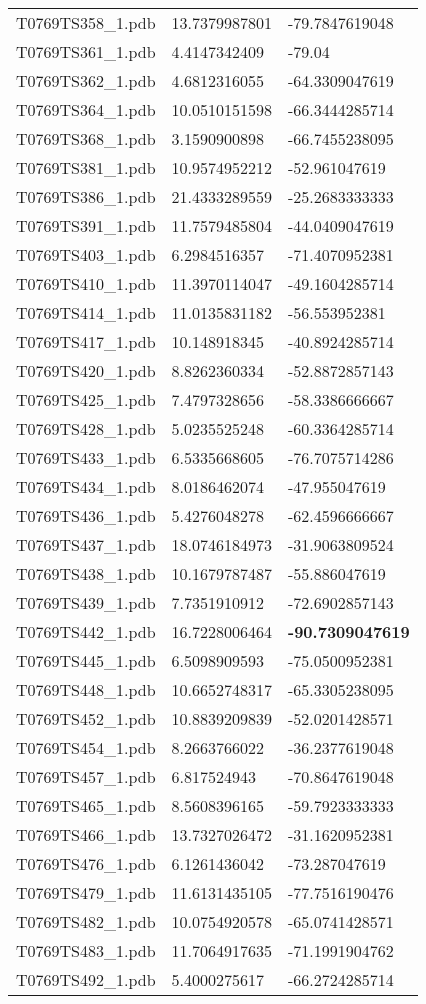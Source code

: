 \begin{longtable}{lll}
T0769TS358\_1.pdb & 13.7379987801 & -79.7847619048\\
T0769TS361\_1.pdb & 4.4147342409 & -79.04\\
T0769TS362\_1.pdb & 4.6812316055 & -64.3309047619\\
T0769TS364\_1.pdb & 10.0510151598 & -66.3444285714\\
T0769TS368\_1.pdb & 3.1590900898 & -66.7455238095\\
T0769TS381\_1.pdb & 10.9574952212 & -52.961047619\\
T0769TS386\_1.pdb & 21.4333289559 & -25.2683333333\\
T0769TS391\_1.pdb & 11.7579485804 & -44.0409047619\\
T0769TS403\_1.pdb & 6.2984516357 & -71.4070952381\\
T0769TS410\_1.pdb & 11.3970114047 & -49.1604285714\\
T0769TS414\_1.pdb & 11.0135831182 & -56.553952381\\
T0769TS417\_1.pdb & 10.148918345 & -40.8924285714\\
T0769TS420\_1.pdb & 8.8262360334 & -52.8872857143\\
T0769TS425\_1.pdb & 7.4797328656 & -58.3386666667\\
T0769TS428\_1.pdb & 5.0235525248 & -60.3364285714\\
T0769TS433\_1.pdb & 6.5335668605 & -76.7075714286\\
T0769TS434\_1.pdb & 8.0186462074 & -47.955047619\\
T0769TS436\_1.pdb & 5.4276048278 & -62.4596666667\\
T0769TS437\_1.pdb & 18.0746184973 & -31.9063809524\\
T0769TS438\_1.pdb & 10.1679787487 & -55.886047619\\
T0769TS439\_1.pdb & 7.7351910912 & -72.6902857143\\
T0769TS442\_1.pdb & 16.7228006464 & \textbf{-90.7309047619}\\
T0769TS445\_1.pdb & 6.5098909593 & -75.0500952381\\
T0769TS448\_1.pdb & 10.6652748317 & -65.3305238095\\
T0769TS452\_1.pdb & 10.8839209839 & -52.0201428571\\
T0769TS454\_1.pdb & 8.2663766022 & -36.2377619048\\
T0769TS457\_1.pdb & 6.817524943 & -70.8647619048\\
T0769TS465\_1.pdb & 8.5608396165 & -59.7923333333\\
T0769TS466\_1.pdb & 13.7327026472 & -31.1620952381\\
T0769TS476\_1.pdb & 6.1261436042 & -73.287047619\\
T0769TS479\_1.pdb & 11.6131435105 & -77.7516190476\\
T0769TS482\_1.pdb & 10.0754920578 & -65.0741428571\\
T0769TS483\_1.pdb & 11.7064917635 & -71.1991904762\\
T0769TS492\_1.pdb & 5.4000275617 & -66.2724285714\\
\end{longtable}
